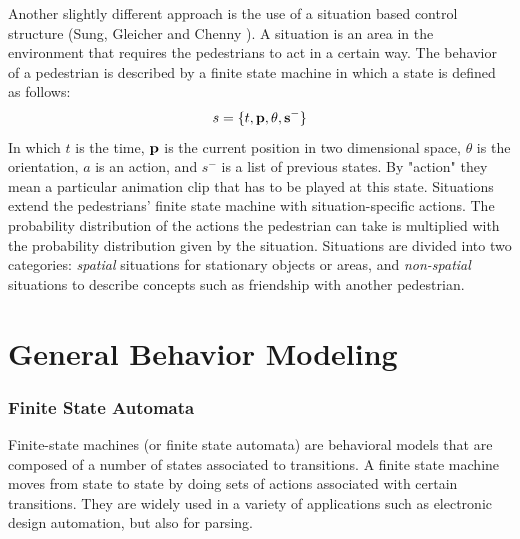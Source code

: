 \documentclass[11pt]{book}
\begin{document}
Another slightly different approach is the use of a situation based control structure (Sung, Gleicher and Chenny \cite{Sung04scalablebehaviors}). A situation is an area in the environment that requires the pedestrians to act in a certain way. The behavior of a pedestrian is described by a finite state machine in which a state is defined as follows:
 \[s = \{t, \bf{p}, \theta, s^- \}\]
In which $t$ is the time, $\bf{p}$ is the current position in two dimensional space, $\theta$ is the orientation, $a$ is an action, and $s^-$ is a list of previous states. By "action" they mean a particular animation clip that has to be played at this state. Situations extend the pedestrians' finite state machine with situation-specific actions. The probability distribution of the actions the pedestrian can take is multiplied with the probability distribution given by the situation. Situations are divided into two categories: \emph{spatial} situations for stationary objects or areas, and \emph{non-spatial} situations to describe concepts such as friendship with another pedestrian.



\section{General Behavior Modeling}
\subsubsection{Finite State Automata}
Finite-state machines (or finite state automata) are behavioral models that are composed of a number of states associated to transitions. A finite state machine moves from state to state by doing sets of actions associated with certain transitions. They are widely used in a variety of applications such as electronic design automation, but also for parsing.
\end{document}
